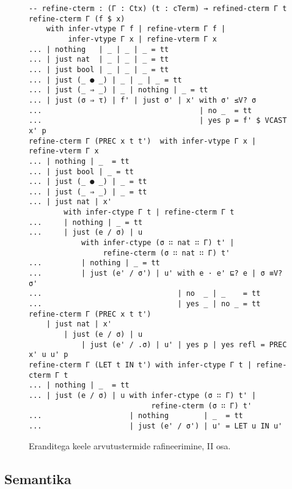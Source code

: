 \documentclass[a4paper,12pt]{article}
\begin{document}
\begin{figure}
  \begin{BVerbatim}
-- refine-cterm : (Γ : Ctx) (t : cTerm) → refined-cterm Γ t
refine-cterm Γ (f $ x)
    with infer-vtype Γ f | refine-vterm Γ f |
         infer-vtype Γ x | refine-vterm Γ x
... | nothing   | _ | _ | _ = tt
... | just nat  | _ | _ | _ = tt
... | just bool | _ | _ | _ = tt
... | just (_ ● _) | _ | _ | _ = tt
... | just (_ ⇒ _) | _ | nothing | _ = tt  
... | just (σ ⇒ τ) | f' | just σ' | x' with σ' ≤V? σ
...                                    | no _  = tt
...                                    | yes p = f' $ VCAST x' p
refine-cterm Γ (PREC x t t')  with infer-vtype Γ x | refine-vterm Γ x
... | nothing | _  = tt
... | just bool | _ = tt
... | just (_ ● _) | _ = tt
... | just (_ ⇒ _) | _ = tt
... | just nat | x'
        with infer-ctype Γ t | refine-cterm Γ t 
...     | nothing | _ = tt
...     | just (e / σ) | u
            with infer-ctype (σ ∷ nat ∷ Γ) t' |
                 refine-cterm (σ ∷ nat ∷ Γ) t'
...         | nothing | _ = tt
...         | just (e' / σ') | u' with e · e' ⊑? e | σ ≡V? σ'
...                               | no  _ | _    = tt
...                               | yes _ | no _ = tt
refine-cterm Γ (PREC x t t')
    | just nat | x'
        | just (e / σ) | u
            | just (e' / .σ) | u' | yes p | yes refl = PREC x' u u' p
refine-cterm Γ (LET t IN t') with infer-ctype Γ t | refine-cterm Γ t 
... | nothing | _  = tt
... | just (e / σ) | u with infer-ctype (σ ∷ Γ) t' |
                            refine-cterm (σ ∷ Γ) t'
...                    | nothing        | _  = tt
...                    | just (e' / σ') | u' = LET u IN u'
  \end{BVerbatim}
  \caption{Eranditega keele arvutustermide rafineerimine, II osa.}
  \label{fig:exc.refine-cterm2}
\end{figure}

\subsection{Semantika}\label{ssec:exc.semantics}
\end{document}
